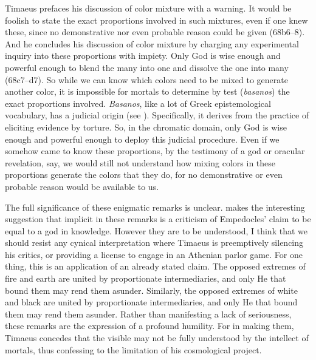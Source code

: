 Timaeus prefaces his discussion of color mixture with a warning. It would be foolish to state the exact proportions involved in such mixtures, even if one knew these, since no demonstrative nor even probable reason could be given (68b6--8). And he concludes his discussion of color mixture by charging any experimental inquiry into these proportions with impiety. Only God is wise enough and powerful enough to blend the many into one and dissolve the one into many (68c7--d7). So while we can know which colors need to be mixed to generate another color, it is impossible for mortals to determine by test (\emph{basanos}) the exact proportions involved. \emph{Basanos}, like a lot of Greek epistemological vocabulary, has a judicial origin (see \citealt[chapter 4]{Lloyd:1979lc}). Specifically, it derives from the practice of eliciting evidence by torture. So, in the chromatic domain, only God is wise enough and powerful enough to deploy this judicial procedure. Even if we somehow came to know these proportions, by the testimony of a god or oracular revelation, say, we would still not understand how mixing colors in these proportions generate the colors that they do, for no demonstrative or even probable reason would be available to us.

The full significance of these enigmatic remarks is unclear. \citet[173--4]{Brisson:1997qr} makes the interesting suggestion that implicit in these remarks is a criticism of Empedocles' claim to be equal to a god in knowledge. However they are to be understood, I think that we should resist any cynical interpretation where Timaeus is preemptively silencing his critics, or providing a license to engage in an Athenian parlor game. For one thing, this is an application of an already stated claim. The opposed extremes of fire and earth are united by proportionate intermediaries, and only He that bound them may rend them asunder. Similarly, the opposed extremes of white and black are united by proportionate intermediaries, and only He that bound them may rend them asunder. Rather than manifesting a lack of seriousness, these remarks are the expression of a profound humility. For in making them, Timaeus concedes that the visible may not be fully understood by the intellect of mortals, thus confessing to the limitation of his cosmological project.

